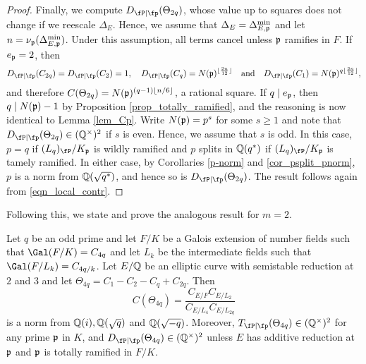 \begin{proof}
    Finally, we compute $\Dp(\Theta_{2q})$, whose value up to squares does not change if we reescale $\Delta_E$. Hence, we assume that $\Delta_E=\Delta_{E,\mathfrak{p}}^{\min}$ and let $n=\nu_{\mathfrak{p}}(\Delta_{E,\mathfrak{p}}^{\min})$. Under this assumption, all terms cancel unless $\mathfrak{p}$ ramifies in $F$. If $e_{\mathfrak{p}}=2$, then
    \begin{equation}\label{eqn_ep=2}
        \Dp(C_{2q})=\Dp(C_2)=1,\quad \Dp(C_q)=N(\pp)^{\floor{\frac{2n}{12}}}\quad\text{and}\quad \Dp(C_1)=N(\pp)^{q\floor{\frac{2n}{12}}},
    \end{equation}
    and therefore $C(\Theta_{2q})=N(\mathfrak{p})^{(q-1)\lfloor n/6\rfloor}$, a rational square. If $q\mid e_{\mathfrak{p}}$, then $q\mid N(\mathfrak{p})-1$ by Proposition \ref{prop_totally_ramified}, and the reasoning is now identical to Lemma \ref{lem_Cp}. Write $N(\mathfrak{p})=p^s$ for some $s\geq1$ and note that $\Dp(\Theta_{2q})\in\QQss$ if $s$ is even. Hence, we assume that $s$ is odd. In this case, $p=q$ if $(L_q)_\fP/K_\pp$ is wildly ramified and $p$ splits in $\mathbb{Q}(q^*)$ if $(L_q)_\fP/K_\pp$ is tamely ramified. In either case, by Corollaries \ref{p-norm} and \ref{cor_psplit_pnorm}, $p$ is a norm from $\mathbb{Q}(\sqrt{q^*})$, and hence so is $\Dp(\Theta_{2q})$.
    The result follows again from \eqref{eqn_local_contr}.

\end{proof}

Following this, we state and prove the analogous result for $m=2$.

\begin{lemma}\label{lem_C4p}
    Let $q$ be an odd prime and let $F/K$ be a Galois extension of number fields such that $\Gal(F/K)=C_{4q}$ and let $L_k$ be the intermediate fields such that $\Gal(F/L_k)=C_{4q/k}$. Let $E/\mathbb{Q}$ be an elliptic curve with semistable reduction at $2$ and $3$ and let $\Theta_{4q}=C_1-C_2-C_q+C_{2q}$. Then 
    $$C(\Theta_{4q})=\frac{C_{E/F}C_{E/L_2}}{C_{E/L_4}C_{E/L_{2q}}}$$
    is a norm from $\mathbb{Q}(i),\mathbb{Q}(\sqrt{q})$ and $\mathbb{Q}(\sqrt{-q})$. Moreover, $\Tp(\Theta_{4q})\in\QQss$ for any prime $\mathfrak{p}$ in $K$, and $\Dp(\Theta_{4q})\in\QQss$ unless $E$ has additive reduction at $\mathfrak{p}$ and $\mathfrak{p}$ is totally ramified in $F/K$.
\end{lemma}

